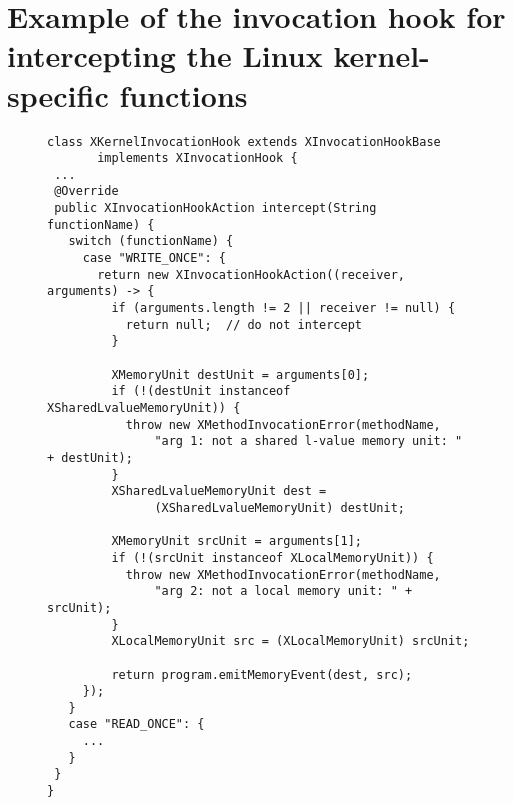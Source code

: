 \section{Example of the invocation hook for intercepting the Linux kernel-specific functions}
\label{apx:hook}

\begin{figure}[H]
\resizebox*{!}{\dimexpr\textheight-2\baselineskip\relax}
%
\begin{lstlisting}
class XKernelInvocationHook extends XInvocationHookBase 
       implements XInvocationHook {
 ...
 @Override
 public XInvocationHookAction intercept(String functionName) {
   switch (functionName) {
     case "WRITE_ONCE": {
       return new XInvocationHookAction((receiver, arguments) -> {
         if (arguments.length != 2 || receiver != null) {
           return null;  // do not intercept
         }

         XMemoryUnit destUnit = arguments[0];
         if (!(destUnit instanceof XSharedLvalueMemoryUnit)) {
           throw new XMethodInvocationError(methodName, 
               "arg 1: not a shared l-value memory unit: " + destUnit);
         }
         XSharedLvalueMemoryUnit dest = 
               (XSharedLvalueMemoryUnit) destUnit;

         XMemoryUnit srcUnit = arguments[1];
         if (!(srcUnit instanceof XLocalMemoryUnit)) {
           throw new XMethodInvocationError(methodName, 
               "arg 2: not a local memory unit: " + srcUnit);
         }
         XLocalMemoryUnit src = (XLocalMemoryUnit) srcUnit;

         return program.emitMemoryEvent(dest, src);
     });
   }
   case "READ_ONCE": {
     ...
   }
 }
}
\end{lstlisting}
%
\end{figure}
